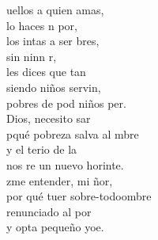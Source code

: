 \documentclass[12pt]{article}
\begin{document}
\begin{multicols*}{2}
\begin{cancion}
	uellos a quien amas,\\
	lo haces n por,\\
	los intas a ser bres, \\
	sin ninn r,\\
	les dices que tan \\
	siendo niños servin, \\
	pobres de pod niños  per.\\
	 Dios, necesito sar\\
	pqué  pobreza salva al mbre\\
	y el terio de la \\
	nos re un nuevo horinte.   \\
	zme entender, mi ñor,\\
	por qué tuer sobre-todoombre\\
	 renunciado al por\\
	y opta  pequeño yoe.\\
\end{cancion}%


\end{multicols*}
\end{document}
